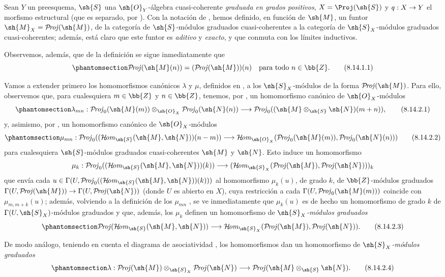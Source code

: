 \documentclass[oneside,10pt]{amsart}
\makeatletter
\newcommand{\ega@arrow}[2]{\mathchoice{#1}{#2}{#2}{#2}}
\renewcommand{\to}{\ega@arrow{\longrightarrow}{\rightarrow}}
\def\shHom{\mathcal{H}\!\mathit{om}}
\def\shProj{\mathcal{P}\!\mathit{roj}}
\newcommand{\oldpage}[2][]{\marginnote{\normalfont\footnotesize\textbf{#1}~|~#2}\ignorespaces}
\let\EGAOriginalLabel\label
\renewcommand{\label}[1]{\phantomsection\EGAOriginalLabel{#1}}
\makeatother
\begin{document}
\begin{env}[8.14.1]
\label{II.8.14.1}
Sean $Y$ un preesquema, $\sh{S}$ una $\sh{O}_Y$-álgebra cuasi-coherente \emph{graduada en grados positivos}, $X=\Proj(\sh{S})$ y $q:X\to Y$ el morfismo estructural (que es separado, por ).
Con la notación de , hemos definido, en función de $\sh{M}$, un funtor $\sh{M}_X=\shProj(\sh{M})$, de la categoría de $\sh{S}$-módulos graduados cuasi-coherentes a la categoría de $\sh{S}_X$-módulos graduados cuasi-coherentes;
además, está claro  que este funtor es \emph{aditivo} y \emph{exacto}, y que conmuta con los límites inductivos.

Observemos, además, que de la definición  se sigue inmediatamente que
\[
\label{II.8.14.1.1}
    \shProj(\sh{M}(n)) = (\shProj(\sh{M}))(n)
    \quad\mbox{para todo $n\in\bb{Z}$.}
\tag{8.14.1.1}
\]
\end{env}

\begin{env}[8.14.2]
\label{II.8.14.2}
Vamos a extender primero los homomorfismos canónicos $\lambda$ y $\mu$, definidos en , a los $\sh{S}_X$-módulos de la forma $\shProj(\sh{M})$.
Para ello, observemos que, para cualesquiera $m\in\bb{Z}$ y $n\in\bb{Z}$, tenemos, por , un homomorfismo canónico de $\sh{O}_X$-módulos
\[
\label{II.8.14.2.1}
    \lambda_{mn}:
    \shProj_0(\sh{M}(m))\otimes_{\sh{O}_X}\shProj_0(\sh{N}(n))
    \to
    \shProj_0((\sh{M}\otimes_{\sh{S}}\sh{N})(m+n)),
\tag{8.14.2.1}
\]
y, asimismo, por , un homomorfismo canónico de $\sh{O}_X$-módulos
\[
\label{II.8.14.2.2}
    \mu_{mn}:
    \shProj_0((\shHom_{\sh{S}}(\sh{M},\sh{N}))(n-m))
    \to
    \shHom_{\sh{O}_X}(\shProj_0(\sh{M}(m)),\shProj_0(\sh{N}(n)))
\tag{8.14.2.2}
\]
para cualesquiera $\sh{S}$-módulos graduados cuasi-coherentes $\sh{M}$ y $\sh{N}$.
Esto induce un homomorfismo
\[
    \mu_k:
    \shProj_0((\shHom_{\sh{S}}(\sh{M},\sh{N}))(k))
    \to
    (\shHom_{\sh{S}_X}(\shProj(\sh{M}),\shProj(\sh{N})))_k
\]
que envía cada $u\in\Gamma(U,\shProj_0((\shHom_{\sh{S}}(\sh{M},\sh{N}))(k)))$ al homomorfismo $\mu_k(u)$, de grado $k$, de $\bb{Z}$-módulos graduados $\Gamma(U,\shProj(\sh{M}))\to\Gamma(U,\shProj(\sh{N}))$ (donde $U$ es abierto en $X$), cuya restricción a cada $\Gamma(U,\shProj_0(\sh{M}(m)))$ coincide con $\mu_{m,m+k}(u)$;
además, volviendo a la definición de los $\mu_{mn}$ , se ve inmediatamente que $\mu_k(u)$ es de hecho un homomorfismo de grado $k$ de $\Gamma(U,\sh{S}_X)$-módulos graduados y que, además, los $\mu_k$ definen un homomorfismo de \emph{$\sh{S}_X$-módulos graduados}
\[
\label{II.8.14.2.3}
    \shProj(\shHom_{\sh{S}}(\sh{M},\sh{N}))
    \to
    \shHom_{\sh{S}_X}(\shProj(\sh{M}),\shProj(\sh{N})).
\tag{8.14.2.3}
\]

De modo análogo, teniendo en cuenta el diagrama de asociatividad , los homomorfismos  dan un homomorfismo de \emph{$\sh{S}_X$-módulos graduados}
\[
\label{II.8.14.2.4}
    \lambda:
    \shProj(\sh{M})\otimes_{\sh{S}_X}\shProj(\sh{N})
    \to
    \shProj(\sh{M}\otimes_{\sh{S}}\sh{N}).
\tag{8.14.2.4}
\]
\end{env}
\oldpage[II]{198}
\end{document}
